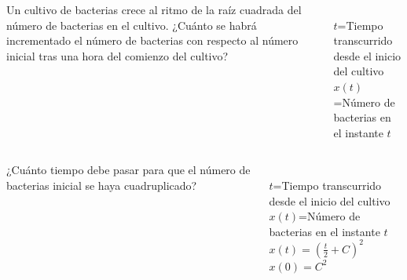 \documentclass[aspectratio=149,10pt,t]{beamer}
\begin{document}
\begin{frame}
\begin{columns}
\begin{column}[T]{0.6\textwidth}
Un cultivo de bacterias crece al ritmo de la raíz cuadrada del número de bacterias en el cultivo.
¿Cuánto se habrá incrementado el número de bacterias con respecto al número inicial tras una hora del comienzo del cultivo?
\end{column}
\begin{column}[T]{0.4\textwidth}
\\
$t$=Tiempo transcurrido desde el inicio del cultivo\\
$x(t)$=Número de bacterias en el instante $t$
\end{column}
\end{columns}
\end{frame}


\begin{frame}
\begin{columns}
\begin{column}[T]{0.6\textwidth}
¿Cuánto tiempo debe pasar para que el número de bacterias inicial se haya cuadruplicado?
\end{column}
\begin{column}[T]{0.4\textwidth}
\\
$t$=Tiempo transcurrido desde el inicio del cultivo\\
$x(t)$=Número de bacterias en el instante $t$\\
$x(t)=\left(\frac{t}{2}+C\right)^2$\\
$x(0)=C^2$
\end{column}
\end{columns}
\end{frame}
\end{document}
